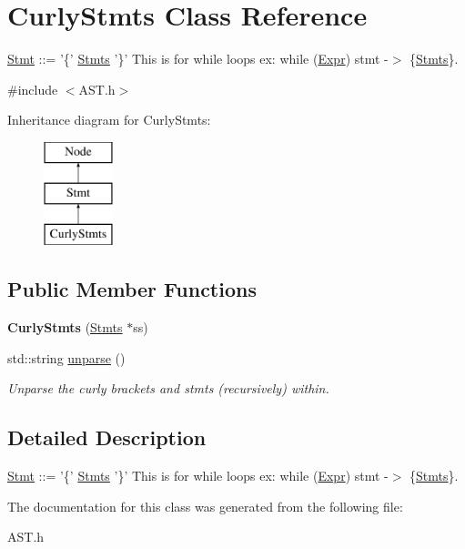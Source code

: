 \hypertarget{classCurlyStmts}{\section{Curly\-Stmts Class Reference}
\label{classCurlyStmts}
}


\hyperlink{classStmt}{Stmt} \-:\-:= '\{' \hyperlink{classStmts}{Stmts} '\}' This is for while loops ex\-: while (\hyperlink{classExpr}{Expr}) stmt -\/$>$ \{\hyperlink{classStmts}{Stmts}\}.  




{\ttfamily \#include $<$A\-S\-T.\-h$>$}

Inheritance diagram for Curly\-Stmts\-:\begin{figure}[H]
\begin{center}
\leavevmode
\includegraphics[height=3.000000cm]{classCurlyStmts}
\end{center}
\end{figure}
\subsection*{Public Member Functions}
\begin{DoxyCompactItemize}
\item 
\hypertarget{classCurlyStmts_a837fafafabe84db350f3c77b112f3ef4}{{\bfseries Curly\-Stmts} (\hyperlink{classStmts}{Stmts} $\ast$ss)}\label{classCurlyStmts_a837fafafabe84db350f3c77b112f3ef4}

\item 
\hypertarget{classCurlyStmts_af141e51f7aede8f95d094f9d91839666}{std\-::string \hyperlink{classCurlyStmts_af141e51f7aede8f95d094f9d91839666}{unparse} ()}\label{classCurlyStmts_af141e51f7aede8f95d094f9d91839666}

\begin{DoxyCompactList}\small\item\em Unparse the curly brackets and stmts (recursively) within. \end{DoxyCompactList}\end{DoxyCompactItemize}


\subsection{Detailed Description}
\hyperlink{classStmt}{Stmt} \-:\-:= '\{' \hyperlink{classStmts}{Stmts} '\}' This is for while loops ex\-: while (\hyperlink{classExpr}{Expr}) stmt -\/$>$ \{\hyperlink{classStmts}{Stmts}\}. 

The documentation for this class was generated from the following file\-:\begin{DoxyCompactItemize}
\item 
A\-S\-T.\-h\end{DoxyCompactItemize}
